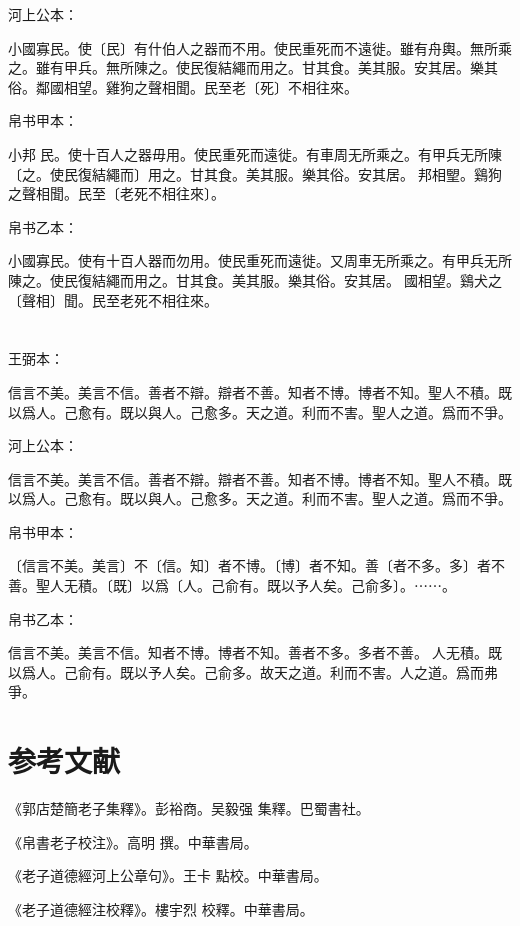 \documentclass[a5paper]{ctexbook}
\begin{document}
    河上公本：

    小國寡民。使〔民〕有什伯人之器而不用。使民重死而不遠徙。雖有舟輿。無所乘之。雖有甲兵。無所陳之。使民復結繩而用之。甘其食。美其服。安其居。樂其俗。鄰國相望。雞狗之聲相聞。民至老〔死〕不相往來。

    帛书甲本：

    小邦󱁈民。使十百人之器毋用。使民重死而遠徙。有車周无所乘之。有甲兵无所陳〔之。使民復結繩而〕用之。甘其食。美其服。樂其俗。安其居。󱁉邦相朢。鷄狗之聲相聞。民至〔老死不相往來〕。

    帛书乙本：

    小國寡民。使有十百人器而勿用。使民重死而遠徙。又周車无所乘之。有甲兵无所陳之。使民復結繩而用之。甘其食。美其服。樂其俗。安其居。𠳵國相望。鷄犬之〔聲相〕聞。民至老死不相往來。

    \chapter{}
    王弼本：

    信言不美。美言不信。善者不辯。辯者不善。知者不博。博者不知。聖人不積。既以爲人。己愈有。既以與人。己愈多。天之道。利而不害。聖人之道。爲而不爭。

    河上公本：

    信言不美。美言不信。善者不辯。辯者不善。知者不博。博者不知。聖人不積。既以爲人。己愈有。既以與人。己愈多。天之道。利而不害。聖人之道。爲而不爭。

    帛书甲本：

    〔信言不美。美言〕不〔信。知〕者不博。〔博〕者不知。善〔者不多。多〕者不善。聖人无積。〔既〕以爲〔人。己俞有。既以予人矣。己俞多〕。⋯⋯。

    帛书乙本：

    信言不美。美言不信。知者不博。博者不知。善者不多。多者不善。𦔻人无積。既以爲人。己俞有。既以予人矣。己俞多。故天之道。利而不害。人之道。爲而弗爭。

    \chapter*{参考文献}
    《郭店楚簡老子集釋》。彭裕商。吴毅强 集釋。巴蜀書社。

    《帛書老子校注》。高明 撰。中華書局。

    《老子道德經河上公章句》。王卡 點校。中華書局。

    《老子道德經注校釋》。樓宇烈 校釋。中華書局。
\end{document}
